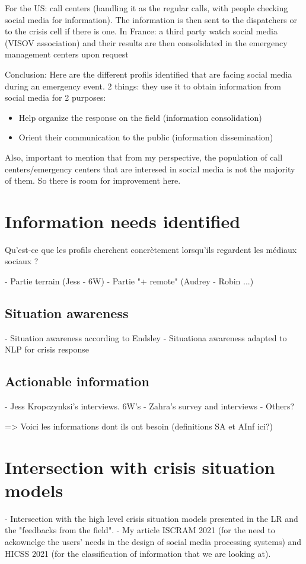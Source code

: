For the US: call centers (handling it as the regular calls, with people checking social media for information).
The information is then sent to the dispatchers or to the crisis cell if there is one.
In France: a third party watch social media (VISOV association) and their results are then consolidated in the emergency management centers upon request

Conclusion: Here are the different profils identified that are facing social media during an emergency event.
2 things: they use it to obtain information from social media for 2 purposes:
\begin{itemize}
    \item Help organize the response on the field (information consolidation)
    \item Orient their communication to the public (information dissemination)
\end{itemize}
Also, important to mention that from my perspective, the population of call centers/emergency centers that are interesed in social media is not the majority of them.
So there is room for improvement here.

\section{Information needs identified}
Qu'est-ce que les profils cherchent concrètement lorsqu'ils regardent les médiaux sociaux ?

- Partie terrain (Jess - 6W)
- Partie "+ remote" (Audrey - Robin ...)

\subsection{Situation awareness}
- Situation awareness according to Endsley
- Situationa awareness adapted to NLP for crisis response

\subsection{Actionable information}
- Jess Kropczynksi's interviews. 6W's
- Zahra's survey and interviews
- Others?

=> Voici les informations dont ils ont besoin (definitions SA et AInf ici?)

\section{Intersection with crisis situation models}
- Intersection with the high level crisis situation models presented in the LR and the "feedbacks from the field".
- My article ISCRAM 2021 (for the need to ackownelge the users' needs in the design of social media processing systems) and HICSS 2021 (for the classification of information that we are looking at).


